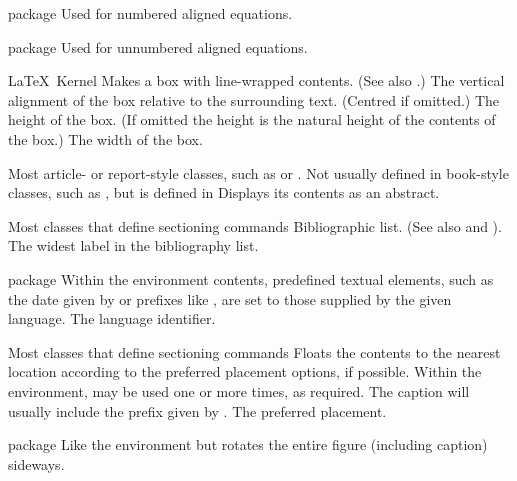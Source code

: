  {}
 { package}
 {Used for numbered aligned equations.}
 {}

 {}
 { package}
 {Used for unnumbered aligned equations.}
 {}

%
 {}%
 {\LaTeX\ Kernel}%
 {Makes a box with line-wrapped contents. (See also .)}%
 {%
   \BeginArgList
     The vertical alignment of the box relative to
     the surrounding text. (Centred if omitted.)
     The height of the box. (If omitted the
     height is the natural height of the contents of the box.)
     The width of the box.
   \EndArgList
 }

%
 {}%
 {Most article- or report-style classes, such as  or
  . Not usually defined in book-style classes, such
  as , but is defined in }%
 {Displays its contents as an abstract.}%
 {}

%
 {}%
 {Most classes that define sectioning commands}%
 {Bibliographic list. (See also  and
  ).}%
 {%
   \BeginArgList
     The widest label in the
     bibliography list.
   \EndArgList
 }

 {}%
 { package}%
 {Within the environment contents, predefined textual elements, such
  as the date given by  or prefixes like ,
  are set to those supplied by the given language.}%
 {%
   \BeginArgList
     The language identifier.
   \EndArgList
 }

 {}%
 {Most classes that define sectioning commands}%
 {%
   Floats the contents to the nearest location according to the
   preferred placement options, if possible. Within the environment,
    may be used one or more times, as required.
   The caption will usually include the prefix given by
   .
 }%
 {%
   \BeginArgList
     The preferred placement.
   \EndArgList
 }

%
 {}%
 { package}%
 {Like the  environment but rotates the entire
  figure (including caption) sideways.}%
 {}


